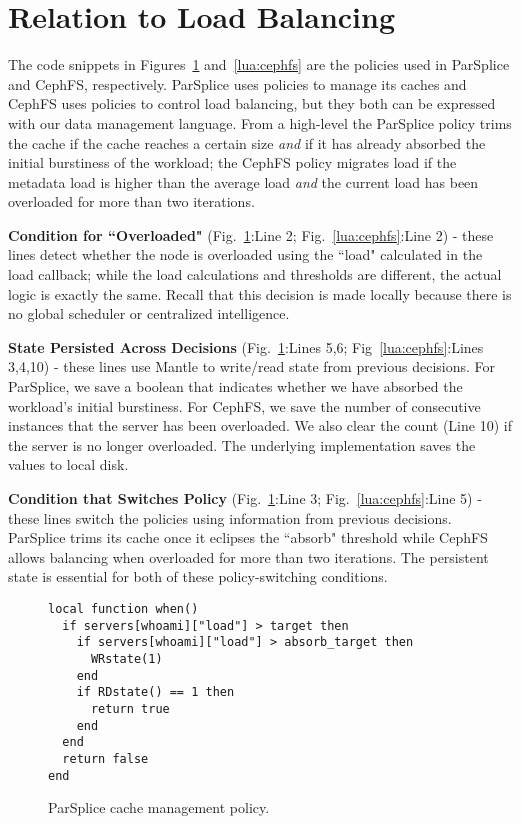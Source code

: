 \section{Relation to Load Balancing}
\label{sec:relation-to-load-balancing}

The code snippets in Figures~\ref{lua:parsplice} and~\ref{lua:cephfs} are the
policies used in ParSplice and CephFS, respectively.  ParSplice uses policies
to manage its caches and CephFS uses policies to control load balancing, but
they both can be expressed with our data management language.  From a
high-level the ParSplice policy trims the cache if the cache reaches a certain
size {\it and} if it has already absorbed the initial burstiness of the
workload; the CephFS policy migrates load if the metadata load is higher than
the average load {\it and} the current load has been overloaded for more than
two iterations.

\textbf{Condition for ``Overloaded"} (Fig.~\ref{lua:parsplice}:Line 2;
Fig.~\ref{lua:cephfs}:Line 2) - these lines detect whether the node is
overloaded using the ``load" calculated in the load callback; while the load
calculations and thresholds are different, the actual logic is exactly the
same.  Recall that this decision is made locally because there is no global
scheduler or centralized intelligence. 

\textbf{State Persisted Across Decisions} (Fig.~\ref{lua:parsplice}:Lines 5,6;
Fig~\ref{lua:cephfs}:Lines 3,4,10) - these lines use Mantle to write/read state
from previous decisions.  For ParSplice, we save a boolean that indicates
whether we have absorbed the workload's initial burstiness. For CephFS, we save
the number of consecutive instances that the server has been overloaded. We
also clear the count (Line 10) if the server is no longer overloaded. The
underlying implementation saves the values to local disk.

\textbf{Condition that Switches Policy} (Fig.~\ref{lua:parsplice}:Line 3;
Fig.~\ref{lua:cephfs}:Line 5) - these lines switch the policies using
information from previous decisions. ParSplice trims its cache once it eclipses
the ``absorb" threshold while CephFS allows balancing when overloaded for more
than two iterations. The persistent state is essential for both of these
policy-switching conditions.

\begin{figure}[tb]
\footnotesize
\begin{verbatim}
local function when()
  if servers[whoami]["load"] > target then
    if servers[whoami]["load"] > absorb_target then
      WRstate(1)
    end
    if RDstate() == 1 then
      return true
    end
  end
  return false
end
\end{verbatim}
\caption{ParSplice cache management policy.\label{lua:parsplice}}
\end{figure}


